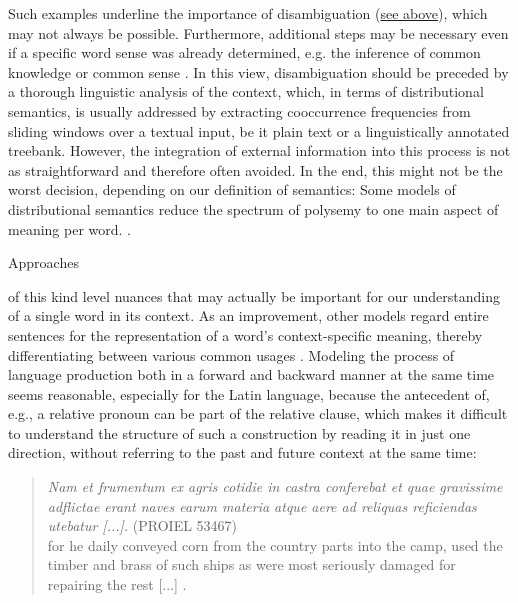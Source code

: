\documentclass[runningheads]{llncs}
\begin{document}
Such examples underline the importance of disambiguation (\hyperref[polysemyProblemForSemanticRelations]{see above}), which may not always be possible. Furthermore, additional steps may be necessary even if a specific word sense was already determined, e.g. the inference of common knowledge or common sense \parencite[427f.]{pinkalSemantik1993}. In this view, disambiguation should be preceded by a thorough linguistic analysis of the context, which, in terms of distributional semantics, is usually addressed by extracting cooccurrence frequencies from sliding windows over a textual input, be it plain text or a linguistically annotated treebank. However, the integration of external information into this process is not as straightforward and therefore often avoided. In the end, this might not be the worst decision, depending on our definition of semantics: Some models of distributional semantics reduce the spectrum of polysemy to one main aspect of meaning per word.
\parencite[4]{faruquiProblemsEvaluationWord2016}.

\hypertarget{ELMO}{Approaches} of this kind level nuances that may actually be important for our understanding of a single word in its context. As an improvement, other models regard entire sentences for the representation of a word's context-specific meaning, thereby differentiating between various common usages \parencite[2f.]{petersDeepContextualizedWord2018}. Modeling the process of language production both in a forward and backward manner at the same time seems reasonable, especially for the Latin language, because the antecedent of, e.g., a relative pronoun can be part of the relative clause, which makes it difficult to understand the structure of such a construction by reading it in just one direction, without referring to the past and future context at the same time:
\blockquote{\textit{Nam et frumentum ex agris cotidie in castra conferebat et quae gravissime adflictae erant naves earum materia atque aere ad reliquas reficiendas utebatur [...].} (PROIEL 53467)\\
for he daily conveyed corn from the country parts into the camp, used the timber and brass of such ships as were most seriously damaged for repairing the rest [...] \parencite{mcdevitteCaesarGallicWar1869}.}
\end{document}
